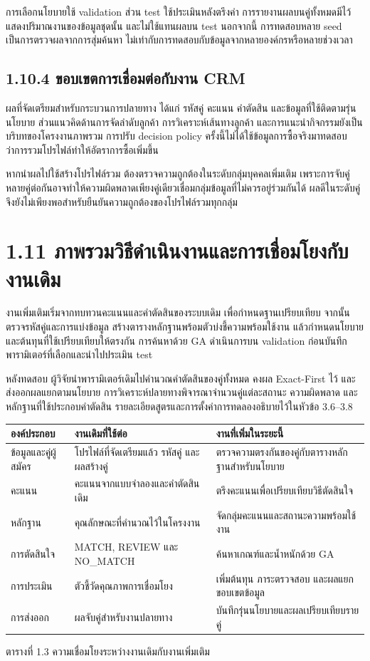 การเลือกนโยบายใช้ validation ส่วน test ใช้ประเมินหลังตรึงค่า การรายงานผลบนคู่ทั้งหมดมีไว้แสดงปริมาณงานของข้อมูลชุดนั้น และไม่ใช้แทนผลบน test นอกจากนี้ การทดสอบหลาย seed เป็นการตรวจผลจากการสุ่มค้นหา ไม่เท่ากับการทดสอบกับข้อมูลจากหลายองค์กรหรือหลายช่วงเวลา

\subsection*{1.10.4 ขอบเขตการเชื่อมต่อกับงาน CRM}
ผลที่จัดเตรียมสำหรับกระบวนการปลายทาง ได้แก่ รหัสคู่ คะแนน คำตัดสิน และข้อมูลที่ใช้ติดตามรุ่นนโยบาย ส่วนแนวคิดด้านการจัดลำดับลูกค้า การวิเคราะห์เส้นทางลูกค้า และการแนะนำกิจกรรมยังเป็นบริบทของโครงงานภาพรวม การปรับ decision policy ครั้งนี้ไม่ได้ใช้ข้อมูลการซื้อจริงมาทดสอบว่าการรวมโปรไฟล์ทำให้อัตราการซื้อเพิ่มขึ้น

หากนำผลไปใช้สร้างโปรไฟล์รวม ต้องตรวจความถูกต้องในระดับกลุ่มบุคคลเพิ่มเติม เพราะการจับคู่หลายคู่ต่อกันอาจทำให้ความผิดพลาดเพียงคู่เดียวเชื่อมกลุ่มข้อมูลที่ไม่ควรอยู่ร่วมกันได้ ผลดีในระดับคู่จึงยังไม่เพียงพอสำหรับยืนยันความถูกต้องของโปรไฟล์รวมทุกกลุ่ม

\section*{1.11 ภาพรวมวิธีดำเนินงานและการเชื่อมโยงกับงานเดิม}
งานเพิ่มเติมเริ่มจากทบทวนคะแนนและคำตัดสินของระบบเดิม เพื่อกำหนดฐานเปรียบเทียบ จากนั้นตรวจรหัสคู่และการแบ่งข้อมูล สร้างตารางหลักฐานพร้อมตัวบ่งชี้ความพร้อมใช้งาน แล้วกำหนดนโยบายและต้นทุนที่ใช้เปรียบเทียบให้ตรงกัน การค้นหาด้วย GA ดำเนินการบน validation ก่อนบันทึกพารามิเตอร์ที่เลือกและนำไปประเมิน test

หลังทดสอบ ผู้วิจัยนำพารามิเตอร์เดิมไปคำนวณคำตัดสินของคู่ทั้งหมด คงผล Exact-First ไว้ และส่งออกผลแยกตามนโยบาย การวิเคราะห์ปลายทางพิจารณาจำนวนคู่แต่ละสถานะ ความผิดพลาด และหลักฐานที่ใช้ประกอบคำตัดสิน รายละเอียดสูตรและการตั้งค่าการทดลองอธิบายไว้ในหัวข้อ 3.6--3.8

\begin{center}\small
\begin{tabularx}{\linewidth}{p{3cm}XX}
\toprule
องค์ประกอบ & งานเดิมที่ใช้ต่อ & งานที่เพิ่มในระยะนี้ \\
\midrule
ข้อมูลและคู่ผู้สมัคร & โปรไฟล์ที่จัดเตรียมแล้ว รหัสคู่ และผลสร้างคู่ & ตรวจความตรงกันของคู่กับตารางหลักฐานสำหรับนโยบาย \\
คะแนน & คะแนนจากแบบจำลองและคำตัดสินเดิม & ตรึงคะแนนเพื่อเปรียบเทียบวิธีตัดสินใจ \\
หลักฐาน & คุณลักษณะที่คำนวณไว้ในโครงงาน & จัดกลุ่มคะแนนและสถานะความพร้อมใช้งาน \\
การตัดสินใจ & MATCH, REVIEW และ NO\_MATCH & ค้นหาเกณฑ์และน้ำหนักด้วย GA \\
การประเมิน & ตัวชี้วัดคุณภาพการเชื่อมโยง & เพิ่มต้นทุน ภาระตรวจสอบ และผลแยกขอบเขตข้อมูล \\
การส่งออก & ผลจับคู่สำหรับงานปลายทาง & บันทึกรุ่นนโยบายและผลเปรียบเทียบรายคู่ \\
\bottomrule
\end{tabularx}
\par ตารางที่ 1.3 ความเชื่อมโยงระหว่างงานเดิมกับงานเพิ่มเติม
\end{center}

